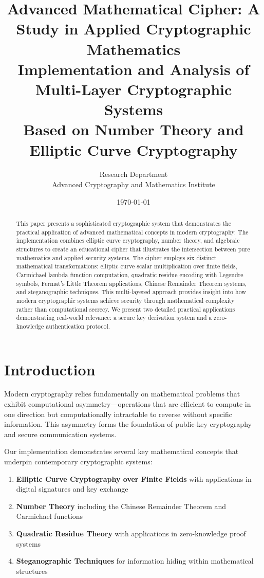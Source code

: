 \documentclass[12pt,a4paper]{article}
\title{\textbf{Advanced Mathematical Cipher: A Study in Applied Cryptographic Mathematics}\\
\large{Implementation and Analysis of Multi-Layer Cryptographic Systems\\Based on Number Theory and Elliptic Curve Cryptography}}
\author{
Research Department\\
Advanced Cryptography and Mathematics Institute
}
\date{\today}
\begin{document}
\maketitle

\begin{abstract}
This paper presents a sophisticated cryptographic system that demonstrates the practical application of advanced mathematical concepts in modern cryptography. The implementation combines elliptic curve cryptography, number theory, and algebraic structures to create an educational cipher that illustrates the intersection between pure mathematics and applied security systems. The cipher employs six distinct mathematical transformations: elliptic curve scalar multiplication over finite fields, Carmichael lambda function computation, quadratic residue encoding with Legendre symbols, Fermat's Little Theorem applications, Chinese Remainder Theorem systems, and steganographic techniques. This multi-layered approach provides insight into how modern cryptographic systems achieve security through mathematical complexity rather than computational secrecy. We present two detailed practical applications demonstrating real-world relevance: a secure key derivation system and a zero-knowledge authentication protocol.
\end{abstract}

\tableofcontents

\section{Introduction}

Modern cryptography relies fundamentally on mathematical problems that exhibit computational asymmetry—operations that are efficient to compute in one direction but computationally intractable to reverse without specific information. This asymmetry forms the foundation of public-key cryptography and secure communication systems.

Our implementation demonstrates several key mathematical concepts that underpin contemporary cryptographic systems:

\begin{enumerate}
    \item \textbf{Elliptic Curve Cryptography over Finite Fields} with applications in digital signatures and key exchange
    \item \textbf{Number Theory} including the Chinese Remainder Theorem and Carmichael functions
    \item \textbf{Quadratic Residue Theory} with applications in zero-knowledge proof systems
    \item \textbf{Steganographic Techniques} for information hiding within mathematical structures
\end{enumerate}
\end{document}
